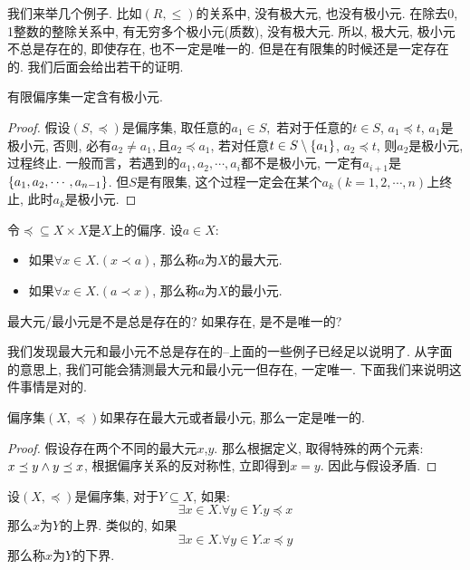 我们来举几个例子. 比如$(R,\leq)$的关系中, 没有极大元, 也没有极小元. 在除去0, 1整数的整除关系中, 有无穷多个极小元(质数), 没有极大元. 所以, 极大元, 极小元不总是存在的, 即使存在, 也不一定是唯一的. 但是在有限集的时候还是一定存在的. 我们后面会给出若干的证明. 

\begin{theorem}
	有限偏序集一定含有极小元.
\end{theorem}

\begin{proof}
	假设$(S,\preceq)$是偏序集, 取任意的$a_1\in S,$ 若对于任意的$t\in S$, $a_1\preceq t$, $a_1$是极小元, 否则, 必有$a_2\neq a_1,$且$a_2\preceq a_1$, 若对任意$t\in S\setminus\{a_1\}$, $a_2\preceq t$, 则$a_2$是极小元, 过程终止. 一般而言，若遇到的$a_1,a_2,\cdots, a_i$都不是极小元, 一定有$a_{i+1}$是$\{a_1,a_2,\cdots, a_{n-1}\}$. 但$S$是有限集, 这个过程一定会在某个$a_k(k=1,2,\cdots,n)$上终止, 此时$a_k$是极小元. 
\end{proof}


\begin{definition}
	令$\preceq\subseteq X \times X$是$X$上的偏序. 设$a\in X$: 
\begin{itemize}
		\item 如果$\forall x\in X. (x\prec a)$, 那么称$a$为$X$的最大元.
		\item 如果$\forall x\in X. (a\prec x)$, 那么称$a$为$X$的最小元.
	\end{itemize} 

\end{definition}
	
\begin{bonus}
	最大元/最小元是不是总是存在的? 如果存在, 是不是唯一的? 
\end{bonus}

我们发现最大元和最小元不总是存在的--上面的一些例子已经足以说明了. 从字面的意思上, 我们可能会猜测最大元和最小元一但存在, 一定唯一. 下面我们来说明这件事情是对的. 

\begin{theorem}[极大元极小元唯一性]
	偏序集$(X,\preceq)$如果存在最大元或者最小元, 那么一定是唯一的. 
\end{theorem}

\begin{proof}
	假设存在两个不同的最大元$x$,$y$. 那么根据定义, 取得特殊的两个元素: $x\preceq y \land y\preceq x$, 根据偏序关系的反对称性, 立即得到$x=y$. 因此与假设矛盾. 
\end{proof}

\begin{definition}[上界与下界]
	设$(X,\preceq)$是偏序集, 对于$Y \subseteq X$, 如果:
	$$
	\exists x\in X. \forall y\in Y. y\preceq x
	$$
	那么$x$为$Y$的上界. 类似的, 如果
	$$
	\exists x\in X. \forall y\in Y. x\preceq y
	$$
	那么称$x$为$Y$的下界. 
\end{definition}






